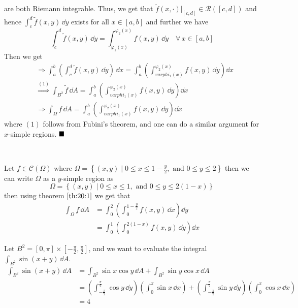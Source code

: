 \documentclass[../Analysis-3]{subfiles}
\begin{document}
are both Riemann integrable. Thus, we get that $\tilde{f}(x,\cdot)\vert_{[c,d]} \in \mathscr{R}([c,d])$ and hence $\displaystyle{\int_c^d \tilde{f}(x,y) \, \dd y}$ exists for all $x \in [a,b]$ and further we have
\[
    \int_c^d \tilde{f}(x,y) \, \dd y = \int_{\varphi_1(x)}^{\varphi_2(x)} f(x,y) \, \dd y \quad \forall \, x \in [a,b]
\]
Then we get
\begin{align*}
     & \Longrightarrow \int_a^b \left( \int_c^d \tilde{f}(x,y) \, \dd y\right)\, \dd x = \int_a^b \left( \int_{varphi_1(x)}^{\varphi_2(x)} f(x,y) \, \dd y\right) \dd x \\
     & \overset{(1)}{\Longrightarrow} \int_{B^2} \tilde{f} \, \dd A = \int_a^b \left( \int_{varphi_1(x)}^{\varphi_2(x)} f(x,y) \, \dd y\right) \dd x                    \\
     & \Longrightarrow \int_{\Omega} f \, \dd A = \int_a^b \left( \int_{varphi_1(x)}^{\varphi_2(x)} f(x,y) \, \dd y\right) \dd x
\end{align*}
where $(1)$ follows from Fubini's theorem, and one can do a similar argument for $x$-simple regions. $\hfill \blacksquare$

\

\begin{Eg}{}{}
    Let $f \in \mathscr{C}(\Omega)$ where $\Omega = \left\{ (x,y) \mid 0 \leq x \leq 1 - \frac{y}{2}, \mbox{ and } 0 \leq y \leq 2 \right\}$ then we can write $\Omega$ as a $y$-simple region as
    \[
        \Omega = \left\{ (x,y) \mid 0 \leq x \leq 1, \mbox{ and } 0 \leq y \leq 2(1-x) \right\}
    \]
    then using theorem $\ref{th:20:1}$ we get that
    \begin{align*}
        \int_{\Omega} f \, \dd A & = \int_0^2 \left( \int_0^{1-\frac{y}{2}} f(x,y) \, \dd x\right) \dd y \\
                                 & = \int_0^1 \left( \int_0^{2(1-x)} f(x,y) \, \dd y\right) \dd x
    \end{align*}
\end{Eg}

\begin{Eg}{}{}
    Let $B^2 = [0,\pi] \times [-\frac{\pi}{2}, \frac{\pi}{2}]$, and we want to evaluate the integral $\int_{B^2} \sin (x+y) \, \dd A$.
    \begin{align*}
        \int_{B^2}\sin(x+y) \, \dd A & = \int_{B^2} \sin x \cos y \, \dd A + \int_{B^2} \sin y \cos x \, \dd A                                                                                                                                                             \\
                                     & = \left( \int_{-\frac{\pi}{2}}^{\frac{\pi}{2}} \cos y \, \dd y\right)\left( \int_{0}^{\pi} \sin x \, \dd x\right) + \left( \int_{-\frac{\pi}{2}}^{\frac{\pi}{2}} \sin y \, \dd y\right)\left( \int_{0}^{\pi} \cos x \, \dd x\right) \\
                                     & = 4
    \end{align*}
\end{Eg}
\end{document}
